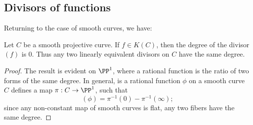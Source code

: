  
%
%
%

\subsection{Divisors of functions}
Returning to the case of smooth curves, we have:
\begin{theorem}\label{degree defn}
Let $C$ be a smooth projective curve. If $f\in K(C)$, then the degree of the divisor $(f)$ is 0. Thus any two linearly equivalent divisors on $C$ have the
same degree.
\end{theorem}

\begin{proof}
 The result is evident on $\PP^1$, where a rational 
function is the ratio of two forms of the same degree. In general, is a rational function $\phi$ on a smooth curve $C$ defines a map $\pi : C \to \PP^1$, such that
$$
(\phi) = \pi^{-1}(0) - \pi^{-1}(\infty);
$$
since any non-constant map of smooth curves is flat, any two fibers have the same degree. 
\end{proof}

